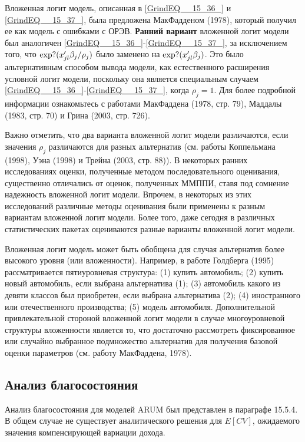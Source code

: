 Вложенная логит модель, описанная в \eqref{GrindEQ__15_36_} и \eqref{GrindEQ__15_37_}, была предложена МакФадденом (1978), который получил ее как модель с ошибками с ОРЭВ. \textbf{Ранний вариант }вложенной логит модели был аналогичен \eqref{GrindEQ__15_36_}-\eqref{GrindEQ__15_37_}, за исключением того, что ${\rm exp}?(x'_{jl}{\beta }_j/{\rho }_j)$ было заменено на ${\rm exp}?(x'_{jl}{\beta }_j)$. Это было альтернативным способом вывода модели, как естественного расширения условной логит модели, поскольку она является специальным случаем \eqref{GrindEQ__15_36_}-\eqref{GrindEQ__15_37_}, когда ${\rho }_j=1.$ Для более подробной информации ознакомьтесь с работами МакФаддена (1978, стр. 79), Маддалы (1983, стр. 70) и Грина (2003, стр. 726).

Важно отметить, что два варианта вложенной логит модели различаются, если значения ${\rho }_j$ различаются для разных альтернатив (см. работы Коппельмана (1998), Уэна (1998) и Трейна (2003, стр. 88)). В некоторых ранних исследованиях оценки, полученные методом последовательного оценивания, существенно отличались от оценок, полученных ММППИ, ставя под сомнение надежность вложенной логит модели. Впрочем, в некоторых из этих исследований различные методы оценивания были применены к разным вариантам вложенной логит модели. Более того, даже сегодня в различных статистических пакетах оцениваются разные варианты вложенной логит модели.

Вложенная логит модель может быть обобщена для случая альтернатив более высокого уровня (или вложенности). Например, в работе Голдберга (1995) рассматривается пятиуровневая структура: (1) купить автомобиль; (2) купить новый автомобиль, если выбрана альтернатива (1); (3) автомобиль какого из девяти классов был приобретен, если выбрана альтернатива (2); (4) иностранного или отечественного производства; (5) модель автомобиля. Дополнительной привлекательной стороной вложенной логит модели в случае многоуровневой структуры вложенности является то, что достаточно рассмотреть фиксированное или случайно выбранное подмножество альтернатив для получения базовой оценки параметров (см. работу МакФаддена, 1978).

\subsection{Анализ благосостояния}

Анализ благосостояния для моделей ARUM был представлен в параграфе 15.5.4. В общем случае не существует аналитического решения для $E\left[CV\right]$, ожидаемого значения компенсирующей вариации дохода.

